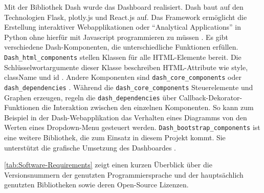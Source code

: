     Mit der Bibliothek Dash wurde das Dashboard realisiert. Dash baut auf den Technologien Flask, plotly.js und React.js auf. Das Framework ermöglicht die Erstellung interaktiver Webapplikationen 
    oder \enquote{Analytical Applications} in Python ohne hierfür mit Javascript programmieren zu müssen \cite[vgl.][]{plotly_dash_2021}.
    Es gibt verschiedene Dash-Komponenten, die unterschiedliche Funktionen erfüllen. \texttt{Dash\_html\_components} stellen Klassen für alle HTML-Elemente bereit.
    Die Schlüsselwortargumente dieser Klasse beschreiben HTML-Attribute wie style, className und id \cite[vgl.][]{plotly_dash_2021-2}. 
    Andere Komponenten sind \texttt{dash\_core\_components} oder \texttt{dash\_dependencies} \cite[vgl.][]{plotly_dash_2021-1}. Während die \texttt{dash\_core\_components}
    Steuerelemente und Graphen erzeugen, regeln die \texttt{dash\_dependencies} über Callback-Dekorator-Funktionen die Interaktion zwischen den einzelnen Komponenten.
    So kann zum Beispiel in der Dash-Webapplikation das Verhalten eines Diagramms von den Werten eines Dropdown-Menu gesteuert werden. 
    \texttt{Dash\_bootstrap\_components} ist eine weitere Bibliothek, die zum Einsatz in diesem Projekt kommt. Sie unterstützt die grafische Umsetzung
    des Dashboardes \cite[vgl.][]{faculty_dash_2021}.

    \autoref{tab:Software-Requirements} zeigt einen kurzen Überblick über die Versionsnummern der genutzten Programmiersprache und der hauptsächlich 
    genutzten Bibliotheken sowie deren Open-Source Lizenzen.
    
